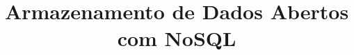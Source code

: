 \documentclass[bacharelado]{unb-cic}
\title{Armazenamento de Dados Abertos com NoSQL}
\begin{document}
  \maketitle
  \pretextual

  \tableofcontents
  \listoffigures
  \listoftables

  \textual
  
  
  
  
  
  

  \postextual
  
  
\end{document}
